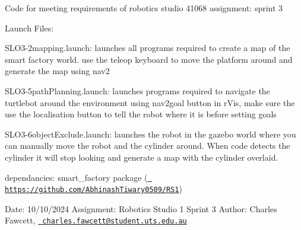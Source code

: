 \label{index_md_MainPage}%
%
Code for meeting requirements of robotics studio 41068 assignment\+: sprint 3

Launch Files\+:

SLO3-\/2mapping.\+launch\+: launches all programs required to create a map of the smart factory world. use the teleop keyboard to move the platform around and generate the map using nav2

SLO3-\/5path\+Planning.\+launch\+: launches programs required to navigate the turtlebot around the environment using nav2goal button in r\+Vis, make sure the use the localisation button to tell the robot where it is before setting goals

SLO3-\/6object\+Exclude.\+launch\+: launches the robot in the gazebo world where you can manually move the robot and the cylinder around. When code detects the cylinder it will stop looking and generate a map with the cylinder overlaid.

dependancies\+: smart\+\_\+factory package (\href{https://github.com/AbhinashTiwary0509/RS1}{\texttt{ https\+://github.\+com/\+Abhinash\+Tiwary0509/\+RS1}})

Date\+: 10/10/2024 Assignment\+: Robotics Studio 1 Sprint 3 Author\+: Charles Fawcett, \href{mailto:charles.fawcett@student.uts.edu.au}{\texttt{ charles.\+fawcett@student.\+uts.\+edu.\+au}} 